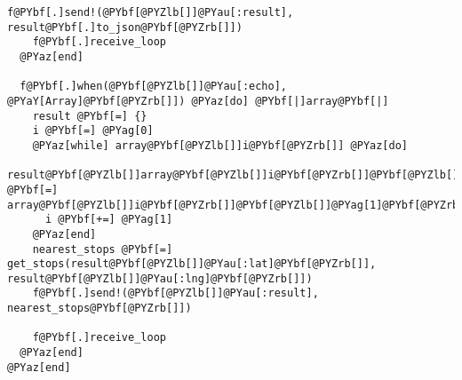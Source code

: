 \begin{Verbatim}[commandchars=@\[\]]
    f@PYbf[.]send!(@PYbf[@PYZlb[]]@PYau[:result], result@PYbf[.]to_json@PYbf[@PYZrb[]])
    f@PYbf[.]receive_loop
  @PYaz[end]
  
  f@PYbf[.]when(@PYbf[@PYZlb[]]@PYau[:echo], @PYaY[Array]@PYbf[@PYZrb[]]) @PYaz[do] @PYbf[|]array@PYbf[|]
    result @PYbf[=] {}
    i @PYbf[=] @PYag[0]
    @PYaz[while] array@PYbf[@PYZlb[]]i@PYbf[@PYZrb[]] @PYaz[do]
      result@PYbf[@PYZlb[]]array@PYbf[@PYZlb[]]i@PYbf[@PYZrb[]]@PYbf[@PYZlb[]]@PYag[0]@PYbf[@PYZrb[]]@PYbf[@PYZrb[]] @PYbf[=] array@PYbf[@PYZlb[]]i@PYbf[@PYZrb[]]@PYbf[@PYZlb[]]@PYag[1]@PYbf[@PYZrb[]]@PYbf[.]map(@PYbf[&]@PYau[:chr])@PYbf[.]join
      i @PYbf[+=] @PYag[1]
    @PYaz[end]
    nearest_stops @PYbf[=] get_stops(result@PYbf[@PYZlb[]]@PYau[:lat]@PYbf[@PYZrb[]], result@PYbf[@PYZlb[]]@PYau[:lng]@PYbf[@PYZrb[]])
    f@PYbf[.]send!(@PYbf[@PYZlb[]]@PYau[:result], nearest_stops@PYbf[@PYZrb[]])
    
    f@PYbf[.]receive_loop
  @PYaz[end]
@PYaz[end]
\end{Verbatim}
